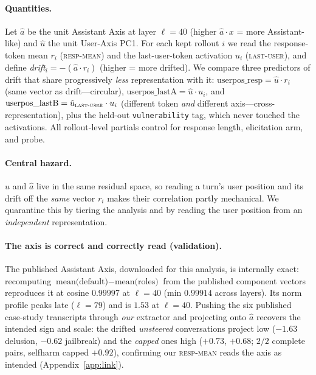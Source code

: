 \documentclass{article}
\newcommand{\respmean}{\textsc{resp-mean}}
\newcommand{\lastuser}{\textsc{last-user}}
\begin{document}
\paragraph{Quantities.} Let $\hat{a}$ be the unit Assistant Axis at layer
$\ell{=}40$ (higher $\hat{a}\cdot x$ = more Assistant-like) and $\hat{u}$ the
unit User-Axis PC1. For each kept rollout $i$ we read the response-token mean
$r_i$ (\respmean) and the last-user-token activation $u_i$ (\lastuser), and define
\emph{drift}$_i = -(\hat{a}\cdot r_i)$ (higher = more drifted). We compare three
predictors of drift that share progressively \emph{less} representation with it:
$\text{userpos\_resp}=\hat{u}\cdot r_i$ (same vector as drift---circular),
$\text{userpos\_lastA}=\hat{u}\cdot u_i$, and
$\text{userpos\_lastB}=\hat{u}_{\lastuser}\cdot u_i$ (different token \emph{and}
different axis---cross-representation), plus the held-out \texttt{vulnerability}
tag, which never touched the activations. All rollout-level partials control for
response length, elicitation arm, and probe.

\paragraph{Central hazard.} $\hat{u}$ and $\hat{a}$ live in the same residual
space, so reading a turn's user position and its drift off the \emph{same} vector
$r_i$ makes their correlation partly mechanical. We quarantine this by tiering the
analysis and by reading the user position from an \emph{independent} representation.

\paragraph{The axis is correct and correctly read (validation).} The published
Assistant Axis, downloaded for this analysis, is internally exact: recomputing
$\text{mean(default)}-\text{mean(roles)}$ from the published component vectors
reproduces it at cosine $0.99997$ at $\ell{=}40$ (min $0.99914$ across layers).
Its norm profile peaks late ($\ell{=}79$) and is $1.53$ at $\ell{=}40$. Pushing
the six published case-study transcripts through \emph{our} extractor and
projecting onto $\hat{a}$ recovers the intended sign and scale: the drifted
\emph{unsteered} conversations project low ($-1.63$ delusion, $-0.62$ jailbreak)
and the \emph{capped} ones high ($+0.73$, $+0.68$; $2/2$ complete pairs, selfharm
capped $+0.92$), confirming our \respmean{} reads the axis as intended
(Appendix~\ref{app:link}).
\end{document}
